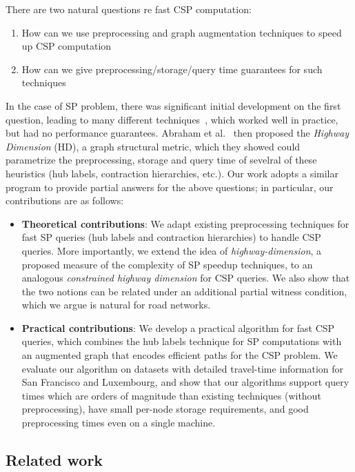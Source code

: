 \noindent There are two natural questions re fast CSP computation:
\begin{enumerate}[nosep,leftmargin=*]
\item How can we use preprocessing and graph augmentation techniques to speed up CSP computation 
\item How can we give preprocessing/storage/query time guarantees for such techniques
\end{enumerate}

In the case of SP problem, there was significant initial development on the first question, leading to many different techniques~\cite{dimacs09}, which worked well in practice, but had no performance guarantees.
Abraham et al.~\cite{highway2010,highway2013} then proposed the \emph{Highway Dimension} (HD), a graph structural metric, which they showed could parametrize the preprocessing, storage and query time of sevelral of these heuristics (hub labels, contraction hierarchies, etc.).
Our work adopts a similar program to provide partial answers for the above questions; in particular, our contributions are as follows:
\begin{itemize}[nosep,leftmargin=*]
\item \textbf{Theoretical contributions}: We adapt existing preprocessing techniques for fast SP queries (hub labels and contraction hierarchies) to handle CSP queries. More importantly, we extend the idea of \emph{highway-dimension}, a proposed measure of the complexity of SP speedup techniques, to an analogous \emph{constrained highway dimension} for CSP queries.
	We also show that the two notions can be related under an additional partial witness condition, which we argue is natural for road networks.
\item \textbf{Practical contributions}: We develop a practical algorithm for fast CSP queries, which combines the hub labels technique for SP computations with an augmented graph that encodes efficient paths for the CSP problem. We evaluate our algorithm on datasets with detailed travel-time information for San Francisco and Luxembourg, and show that our algorithms support query times which are orders of magnitude than existing techniques (without preprocessing), have small per-node storage requirements, and good preprocessing times even on a single machine. 
\end{itemize}	

\subsection{Related work}

